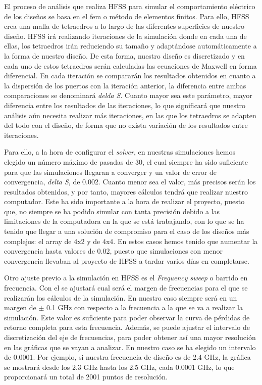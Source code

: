 \par El proceso de análisis que realiza HFSS para simular el comportamiento eléctrico de los diseños se basa en el \gls{fem} o método de elementos finitos. Para ello, HFSS crea una malla de tetraedros a lo largo de las diferentes superficies de nuestro diseño. HFSS irá realizando iteraciones de la simulación donde en cada una de ellas, los tetraedros irán reduciendo su tamaño y adaptándose automáticamente a la forma de nuestro diseño. De esta forma, nuestro diseño es discretizado y en cada uno de estos tetraedros serán calculadas las ecuaciones de Maxwell en forma diferencial. En cada iteración se compararán los resultados obtenidos en cuanto a la dispersión de los puertos con la iteración anterior, la diferencia entre ambas comparaciones se denominará \textit{delda S}. Cuanto mayor sea este parámetro, mayor diferencia entre los resultados de las iteraciones, lo que significará que nuestro análisis aún necesita realizar más iteraciones, en las que los tetraedros se adapten del todo con el diseño, de forma que no exista variación de los resultados entre iteraciones.
\\
\par Para ello, a la hora de configurar el \textit{solver}, en nuestras simulaciones hemos elegido un número máximo de pasadas de 30, el cual  siempre ha sido suficiente para que las simulaciones llegaran a converger y un valor de error de convergencia, \textit{delta S}, de 0.002. Cuanto menor sea el valor, más precisos serán los resultados obtenidos, y por tanto, mayores cálculos tendrá que realizar nuestro computador. Este ha sido importante a la hora de realizar el proyecto, puesto que, no siempre se ha podido simular con tanta precisión debido a las limitaciones de la computadora en la que se está trabajando, con lo que se ha tenido que llegar a una solución de compromiso para el caso de los diseños más complejos: el array de 4x2 y de 4x4. En estos casos hemos tenido que aumentar la convergencia hasta valores de 0.02, puesto que simulaciones con menor convergencia llevaban al proyecto de HFSS a tardar varios días en completarse.
\\
\par Otro ajuste previo a la simulación en HFSS es el \textit{Frequency sweep} o barrido en frecuencia. Con el se ajustará cual será el margen de frecuencias para el que se realizarán los cálculos de la simulación. En nuestro caso siempre será en un margen de $\pm$ 0.1 GHz con respecto a la frecuencia a la que se va a realizar la simulación. Este valor es suficiente para poder observar la curva de pérdidas de retorno completa para esta frecuencia. Además, se puede ajustar el intervalo de discretización del eje de frecuencias, para poder obtener así una mayor resolución en las gráficas que se vayan a analizar. En nuestro caso se ha elegido un intervalo de 0.0001. Por ejemplo, si nuestra frecuencia de diseño es de 2.4 GHz, la gráfica se mostrará desde los 2.3 GHz hasta los 2.5 GHz, cada 0.0001 GHz, lo que proporcionará un total de 2001 puntos de resolución.
